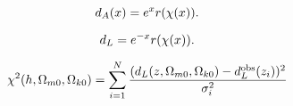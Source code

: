 \begin{equation}\label{eq:m1:angular_distance_def}
    d_A(x) = e^{x}r(\chi(x)).
\end{equation}

\begin{equation}\label{eq:m1:luminosity_distance_def}
    d_L = e^{-x}r(\chi(x)).
\end{equation}


\begin{equation}\label{eq:m1:chi2_test_def}
    \chi^2(h, \Omega_{m0}, \Omega_{k0}) = \sum_{i=1}^N \frac{(d_L(z, \Omega_{m0}, \Omega_{k0}) - d_L^\mathrm{obs}(z_i))^2}{\sigma_i^2}
\end{equation}